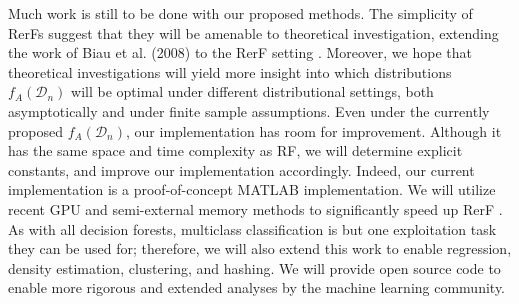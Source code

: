 \documentclass{article}
\providecommand{\mc}[1]{\mathcal{#1}}
\begin{document}
Much work is still to be done with our proposed methods. The simplicity of RerFs suggest that they will be amenable to theoretical investigation, extending the work of Biau et al. (2008) to the RerF setting \cite{biau2008}. Moreover, we hope that theoretical investigations will yield more insight into which distributions $f_A(\mc{D}_n)$ will be optimal under different distributional settings, both asymptotically and under finite sample assumptions. Even under the currently proposed $f_A(\mc{D}_n)$, our implementation has room for improvement. Although it has the same space and time complexity as RF, we will determine explicit constants, and improve our implementation accordingly. Indeed, our current implementation is a proof-of-concept MATLAB implementation. We will utilize recent GPU and semi-external memory methods to significantly speed up RerF \cite{zheng15flashgraph}. As with all decision forests, multiclass classification is but one exploitation task they can be used for; therefore, we will also extend this work to enable regression, density estimation, clustering, and hashing. We will provide open source code to enable more rigorous and extended analyses by the machine learning community.




\end{document}
